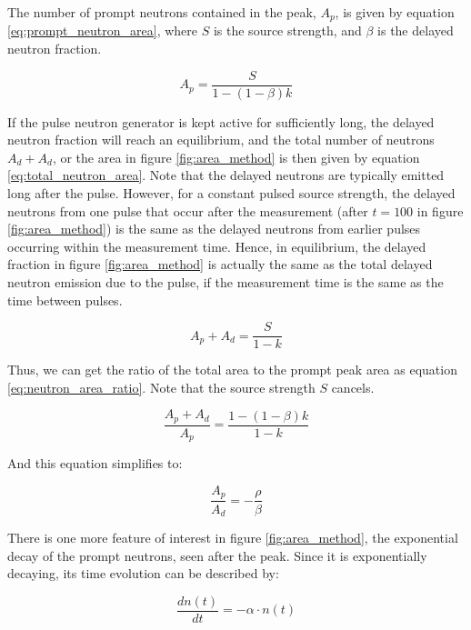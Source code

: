 The number of prompt neutrons contained in the peak, $A_p$, is given by equation \ref{eq:prompt_neutron_area}, where $S$ is the source strength, and $\beta$ is the delayed neutron fraction.

\begin{equation} \label{eq:prompt_neutron_area}
A_p = \frac{S}{1-(1-\beta)k} 
\end{equation}

If the pulse neutron generator is kept active for sufficiently long, the delayed neutron fraction will reach an equilibrium, and the total number of  neutrons $A_d + A_d$, or the area in figure \ref{fig:area_method} is then given by equation \ref{eq:total_neutron_area}. Note that the delayed neutrons are typically emitted long after the pulse. However, for a constant pulsed source strength, the delayed neutrons from one pulse that occur after the measurement (after $t=100$ in figure \ref{fig:area_method}) is the same as the delayed neutrons from earlier pulses occurring within the measurement time. Hence, in equilibrium, the delayed fraction in figure \ref{fig:area_method} is actually the same as the total delayed neutron emission due to the pulse, if the measurement time is the same as the time between pulses. 

\begin{equation} \label{eq:total_neutron_area}
A_p + A_d = \frac{S}{1-k} 
\end{equation}

Thus, we can get the ratio of the total area to the prompt peak area as equation \ref{eq:neutron_area_ratio}. Note that the source strength $S$ cancels.

\begin{equation} \label{eq:neutron_area_ratio}
\frac{A_p + A_d}{A_p} = \frac{1-(1-\beta)k}{1-k} 
\end{equation}

And this equation simplifies to:

\begin{equation} \label{eq:neutron_area_ratio_simple}
\frac{A_p}{A_d} = - \frac{\rho}{\beta} 
\end{equation}

There is one more feature of interest in figure \ref{fig:area_method}, the exponential decay of the prompt neutrons, seen after the peak. Since it is exponentially decaying, its time evolution can be described by:

\begin{equation} \label{eq:area_decay}
\frac{dn(t)}{dt} = - \alpha \cdot n(t)
\end{equation} 

